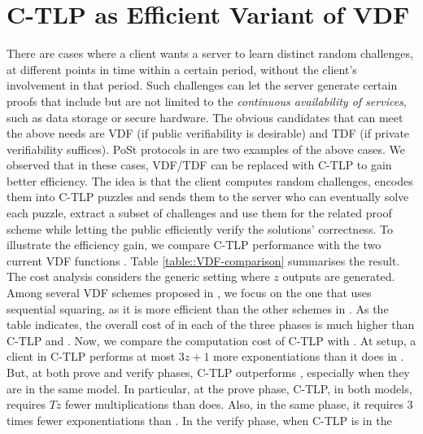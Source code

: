 
\section{C-TLP as Efficient Variant of VDF}\label{section::Variant-of-VDF}


There are cases where a client wants a server to learn distinct random challenges, at different points in time within a certain period, without the client's involvement in that period. Such challenges can let the server generate certain proofs that include but are not limited to the \emph{continuous availability of services}, such as data storage or secure hardware. The obvious candidates that can meet the above needs are VDF (if  public verifiability is desirable) and TDF (if   private verifiability suffices). PoSt protocols  in \cite{Storage-Time} are two examples of the above cases. We observed that in these cases, VDF/TDF can be replaced with  C-TLP to gain better efficiency. The idea is that the client computes random challenges, encodes them into C-TLP puzzles and sends them to the server who can eventually solve each puzzle, extract a subset of challenges and use them for the related proof scheme while letting the public efficiently verify the solutions' correctness. To illustrate the efficiency gain,  we compare C-TLP performance with the two current VDF functions \cite{Wesolowski19,BonehBBF18}. Table \ref{table::VDF-comparison} summarises the result. The cost analysis considers the generic setting where $z$ outputs are generated. Among several VDF schemes proposed in \cite{BonehBBF18}, we focus on the one that uses sequential squaring, as it is more efficient than the other schemes in \cite{BonehBBF18}.   As the table indicates, the overall cost of \cite{BonehBBF18} in each of the three phases is much higher than C-TLP and \cite{Wesolowski19}. Now, we compare the computation cost of C-TLP  with  \cite{Wesolowski19}.  At setup, a client  in C-TLP  performs at most $3z+1$ more exponentiations than it does in \cite{Wesolowski19}. But, at both prove and verify phases, C-TLP   outperforms \cite{BonehBBF18}, especially when they are in the same model. In particular,  at the prove phase, C-TLP, in both models,  requires $Tz$ fewer multiplications than  \cite{Wesolowski19} does. Also, in the same phase, it requires $3$ times fewer exponentiations than \cite{Wesolowski19}. In the verify phase,  when C-TLP is in the
